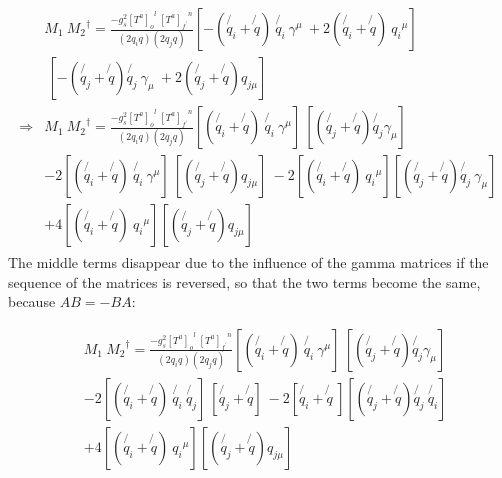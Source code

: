
\begin{align}
\begin{split}
&M_1\: {M_2}^{\dagger} = \frac{-g_s^2 {[T^a]_o}^l \:{[T^a]_{f^{\prime}}}^n }{(2q_i q)(2q_j q)} [-(\not{q_i} + \not{q})\:\not{q_i}\: \gamma^{\mu} \:+2(\not{q_i} + \not{q})\:{q_{i}}^{\mu}]\:\:\:\:\:\:\:\:\:\:\:\:\:\:\:\:\:\:\:\:\:\:\:\:\:\:\:\:\:\:\:\:\:\:\:\:\:\:\:\:\:\:\\
&\:[-(\not{q_j} + \not{q}) \not{q_j} \:\gamma_{\mu} \: + 2(\not{q_j} + \not{q}) {q_{j{\mu}}}]\: \\
\Rightarrow
&M_1\: {M_2}^{\dagger} = \frac{-g_s^2 {[T^a]_o}^l \:{[T^a]_{f^{\prime}}}^n }{(2q_i q)(2q_j q)} 
[(\not{q_i} + \not{q})\:\not{q_i}\: \gamma^{\mu}] \:[(\not{q_j} + \not{q}) \not{q_j} \gamma_{\mu}] \\
&-2[(\not{q_i} + \not{q})\:\not{q_i}\: \gamma^{\mu}]\:[ (\not{q_j} + \not{q}) {q_{j{\mu}}}]
\:-2[(\not{q_i} + \not{q})\:{q_{i}}^{\mu}][(\not{q_j} + \not{q}) \not{q_j} \:\gamma_{\mu}]\\
&+4[(\not{q_i} + \not{q})\:{q_{i}}^{\mu}][(\not{q_j} + \not{q}) {q_{j{\mu}}}]
\end{split}
\end{align}
The middle terms disappear due to the influence of the gamma matrices if the sequence of the matrices is reversed, so that the two terms become the same, because $ AB = -BA $:


\begin{equation}
\begin{split}
&M_1\: {M_2}^{\dagger} = \frac{-g_s^2 {[T^a]_o}^l \:{[T^a]_{f^{\prime}}}^n }{(2q_i q)(2q_j q)} 
[(\not{q_i} + \not{q})\:\not{q_i}\: \gamma^{\mu}] \:[(\not{q_j} + \not{q}) \not{q_j} \gamma_{\mu}] \\
&-2[(\not{q_i} + \not{q})\:\not{q_i}\:\not{q_{j}} ]\:[ \not{q_j} + \not{q} ]
\:-2[\not{q_i} + \not{q}\:][(\not{q_j} + \not{q}) \not{q_j} \:\not{q_i}]\\
&+4[(\not{q_i} + \not{q})\:{q_{i}}^{\mu}][(\not{q_j} + \not{q}) {q_{j{\mu}}}]
\end{split}
\end{equation}


